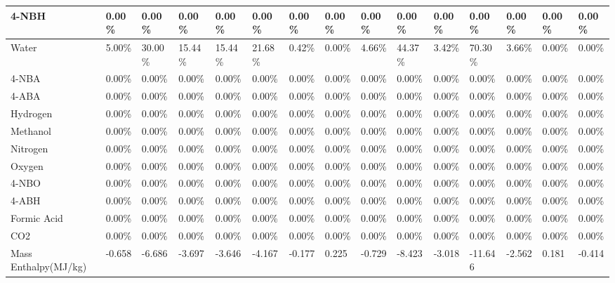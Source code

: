 \begin{landscape}
\begin{table}[H]
\begin{tabular}{|l|l|l|l|l|l|l|l|l|l|l|l|l|l|l|}
4-NBH                   & 0.00\%  & 0.00\%  & 0.00\%  & 0.00\%  & 0.00\%  & 0.00\%  & 0.00\%  & 0.00\%  & 0.00\%  & 0.00\%  & 0.00\%  & 0.00\%  & 0.00\%  & 0.00\%   \\ \hline
Water                   & 5.00\%  & 30.00\% & 15.44\% & 15.44\% & 21.68\% & 0.42\%  & 0.00\%  & 4.66\%  & 44.37\% & 3.42\%  & 70.30\% & 3.66\%  & 0.00\%  & 0.00\%   \\ \hline
4-NBA                   & 0.00\%  & 0.00\%  & 0.00\%  & 0.00\%  & 0.00\%  & 0.00\%  & 0.00\%  & 0.00\%  & 0.00\%  & 0.00\%  & 0.00\%  & 0.00\%  & 0.00\%  & 0.00\%   \\ \hline
4-ABA                   & 0.00\%  & 0.00\%  & 0.00\%  & 0.00\%  & 0.00\%  & 0.00\%  & 0.00\%  & 0.00\%  & 0.00\%  & 0.00\%  & 0.00\%  & 0.00\%  & 0.00\%  & 0.00\%   \\ \hline
Hydrogen                & 0.00\%  & 0.00\%  & 0.00\%  & 0.00\%  & 0.00\%  & 0.00\%  & 0.00\%  & 0.00\%  & 0.00\%  & 0.00\%  & 0.00\%  & 0.00\%  & 0.00\%  & 0.00\%   \\ \hline
Methanol                & 0.00\%  & 0.00\%  & 0.00\%  & 0.00\%  & 0.00\%  & 0.00\%  & 0.00\%  & 0.00\%  & 0.00\%  & 0.00\%  & 0.00\%  & 0.00\%  & 0.00\%  & 0.00\%   \\ \hline
Nitrogen                & 0.00\%  & 0.00\%  & 0.00\%  & 0.00\%  & 0.00\%  & 0.00\%  & 0.00\%  & 0.00\%  & 0.00\%  & 0.00\%  & 0.00\%  & 0.00\%  & 0.00\%  & 0.00\%   \\ \hline
Oxygen                  & 0.00\%  & 0.00\%  & 0.00\%  & 0.00\%  & 0.00\%  & 0.00\%  & 0.00\%  & 0.00\%  & 0.00\%  & 0.00\%  & 0.00\%  & 0.00\%  & 0.00\%  & 0.00\%   \\ \hline
4-NBO                   & 0.00\%  & 0.00\%  & 0.00\%  & 0.00\%  & 0.00\%  & 0.00\%  & 0.00\%  & 0.00\%  & 0.00\%  & 0.00\%  & 0.00\%  & 0.00\%  & 0.00\%  & 0.00\%   \\ \hline
4-ABH                   & 0.00\%  & 0.00\%  & 0.00\%  & 0.00\%  & 0.00\%  & 0.00\%  & 0.00\%  & 0.00\%  & 0.00\%  & 0.00\%  & 0.00\%  & 0.00\%  & 0.00\%  & 0.00\%   \\ \hline
Formic Acid             & 0.00\%  & 0.00\%  & 0.00\%  & 0.00\%  & 0.00\%  & 0.00\%  & 0.00\%  & 0.00\%  & 0.00\%  & 0.00\%  & 0.00\%  & 0.00\%  & 0.00\%  & 0.00\%   \\ \hline
CO2                     & 0.00\%  & 0.00\%  & 0.00\%  & 0.00\%  & 0.00\%  & 0.00\%  & 0.00\%  & 0.00\%  & 0.00\%  & 0.00\%  & 0.00\%  & 0.00\%  & 0.00\%  & 0.00\%   \\ \hline
Mass Enthalpy(MJ/kg)    & -0.658  & -6.686  & -3.697  & -3.646  & -4.167  & -0.177  & 0.225   & -0.729  & -8.423  & -3.018  & -11.646 & -2.562  & 0.181   & -0.414   \\ \hline
\end{tabular}
\end{table}






\end{landscape}
